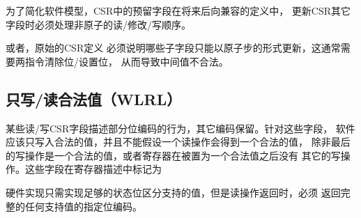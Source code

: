 \begin{commentary}
为了简化软件模型，CSR中的预留字段在将来后向兼容的定义中，
更新CSR其它字段时必须处理非原子的读/修改/写顺序。

或者，原始的CSR定义
必须说明哪些子字段只能以原子步的形式更新，这通常需要两指令清除位/设置位，
从而导致中间值不合法。

\end{commentary}

\subsection*{只写/读合法值（WLRL）}


某些读/写CSR字段描述部分位编码的行为，其它编码保留。针对这些字段，
软件应该只写入合法的值，并且不能假设一个读操作会得到一个合法的值，
除非最后的写操作是一个合法的值，或者寄存器在被置为一个合法值之后没有
其它的写操作。这些字段在寄存器描述中标记为 \wlrl\

\begin{commentary}

硬件实现只需实现足够的状态位区分支持的值，但是读操作返回时，必须
返回完整的任何支持值的指定位编码。
\end{commentary}


